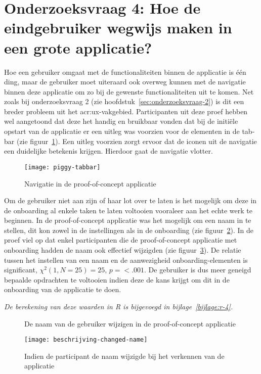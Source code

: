 \section[Onderzoeksvraag 4]{Onderzoeksvraag 4: Hoe de eindgebruiker wegwijs maken in een grote applicatie?}
\label{sec:onderzoeksvraag-4}

Hoe een gebruiker omgaat met de functionaliteiten binnen de applicatie is één ding, maar de gebruiker moet uiteraard ook overweg kunnen met de navigatie binnen deze applicatie om zo bij de gewenste functionaliteiten uit te komen. Net zoals bij onderzoeksvraag 2 (zie hoofdstuk~\ref{sec:onderzoeksvraag-2}) is dit een breder probleem uit het \acrshort{acr:ux}-vakgebied. Participanten uit deze proef hebben wel aangetoond dat deze het handig en bruikbaar vonden dat bij de initiële opstart van de applicatie er een uitleg was voorzien voor de elementen in de tab-bar (zie figuur~\ref{fig:piggy:tabbar}). Een uitleg voorzien zorgt ervoor dat de iconen uit de navigatie een duidelijke betekenis krijgen. Hierdoor gaat de navigatie vlotter.

\begin{figure}[h!]
    \centering
    \texttt{[image: piggy-tabbar]}
    \caption{Navigatie in de proof-of-concept applicatie}
    \label{fig:piggy:tabbar}
\end{figure}

Om de gebruiker niet aan zijn of haar lot over te laten is het mogelijk om deze in de onboarding al enkele taken te laten voltooien vooraleer aan het echte werk te beginnen. In de proof-of-concept applicatie was het mogelijk om een naam in te stellen, dit kon zowel in de instellingen als in de onboarding (zie figuur~\ref{fig:piggy:name}). In de proef viel op dat enkel participanten die de proof-of-concept applicatie met onboarding hadden de naam ook effectief wijzigden (zie figuur~\ref{fig:beschrijving-changed-name}). De relatie tussen het instellen van een naam en de aanwezigheid onboarding-elementen is significant, $\chi^2 (1, N = 25) = 25$, $p = < .001$. De gebruiker is dus meer geneigd bepaalde opdrachten te voltooien indien deze de kans krijgt om dit in de onboarding van de applicatie te doen.

\textit{De berekening van deze waarden in R is bijgevoegd in bijlage~\ref{bijlage:r-4}.}

\begin{figure}[h!]
	\centering
	\qquad
	\qquad
	\caption{De naam van de gebruiker wijzigen in de proof-of-concept applicatie}
	\label{fig:piggy:name}
\end{figure}

\begin{figure}[h]
	\centering
	\texttt{[image: beschrijving-changed-name]}
	\caption{Indien de participant de naam wijzigde bij het verkennen van de applicatie}
	\label{fig:beschrijving-changed-name}
\end{figure}
